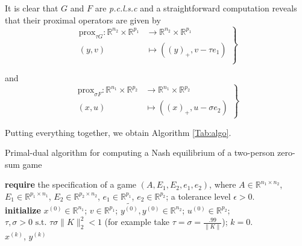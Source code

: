 \documentclass[a4paper,9pt,journal]{IEEEtran}
\begin{document}
It is clear that $G$ and $F$ are \textit{p.c.l.s.c} and a straightforward computation reveals that their proximal operators are given by
\begin{equation}
  \left .
  \begin{split}
    \text{prox}_{\tau G} : \mathbb{R}^{n_2} \times \mathbb{R}^{p_1} &\rightarrow \mathbb{R}^{n_2} \times \mathbb{R}^{p_1}\\
    (y, v) &\mapsto ((y)_+, v - \tau e_1)\\
  \end{split}
  \right\}
\end{equation}

and
\begin{equation}
  \left .
  \begin{split}
    \text{prox}_{\sigma F}: \mathbb{R}^{n_1} \times \mathbb{R}^{p_2} &\rightarrow \mathbb{R}^{n_1} \times \mathbb{R}^{p_2}\\
    (x, u) &\mapsto ((x)_+, u - \sigma e_2)
  \end{split}
  \right\}
\end{equation}

Putting everything together, we obtain Algorithm \ref{Tab:algo}.

\begin{algorithm}[htb]
  \caption{Primal-dual algorithm for computing a Nash equilibrium of a two-person zero-sum game}
  \textbf{require} the specification of a game $(A, E_1, E_2, e_1, e_2)$, where $A \in \mathbb{R}^{n_1 \times n_2}$,
  $E_1 \in \mathbb{R}^{p_1 \times n_1}$, $E_2 \in \mathbb{R}^{p_2 \times n_2}$, $e_1 \in \mathbb{R}^{p_1}$, $e_2 \in \mathbb{R}^{p_2}$;
  a tolerance level $\epsilon > 0$.\\
  \textbf{initialize}
  $x^{(0)} \in \mathbb{R}^{n_1}$; $v \in \mathbb{R}^{p_1}$; $\tilde{y^{(0)}}, y^{(0)} \in \mathbb{R}^{n_2}$; $u^{(0)} \in \mathbb{R}^{p_2}$; 
  $\tau, \sigma > 0 \text{ s.t. }\tau\sigma \|K\|_2^2 < 1$ (for example take $\tau = \sigma = \frac{.99}{\|K\|}$); $k = 0$.\\
   \Return $x^{(k)}$, $y^{(k)}$
  \label{Tab:algo}
\end{algorithm}
\end{document}
